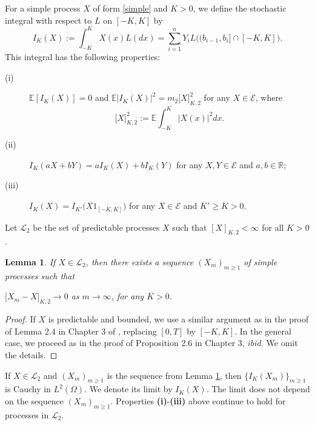 \documentclass[12pt]{article}
\newtheorem{lemma}[theorem]{Lemma}
\def\cE{\mathcal{E}}
\def\cL{\mathcal{L}}
\def\bE{\mathbb{E}}
\def\bR{\mathbb{R}}
\begin{document}

\medskip

For a simple process $X$ of form \eqref{simple} and $K>0$, we define the stochastic integral with respect to $L$ on $[-K,K]$ by
\[
I_K(X):=\int_{-K}^K X(x)L(dx)=\sum_{i=1}^n Y_i L\big((b_{i-1},b_i] \cap [-K,K] \big).
\]
This integral has the following properties:
\begin{description}
\item[(i)] $\bE[I_K(X)]=0$ and $\bE|I_K(X)|^2=m_2 \big[X \big]_{K,2}^2$ for any $X \in \cE$, where
\[
\big[X \big]_{K,2}^2:=\bE \int_{-K}^K |X(x)|^2dx.
\]
\item[(ii)] $I_K(aX+bY)=aI_K(X)+bI_K(Y)$ for any $X,Y \in \cE$ and $a,b \in \bR$;

\item[(iii)] $I_{K}(X)=I_{K'}\big(X 1_{[-K,K]}\big)$ for any $X \in \cE$ and  $K'\geq K>0$.
\end{description}

Let $\cL_2$ be the set of predictable processes $X$ such that $[X]_{K,2}<\infty$ for all $K>0$.



\begin{lemma}
\label{approx}
If $X \in \cL_2$, then there exists a sequence $(X_m)_{m\geq 1}$ of simple processes such that 
 
$\big[X_m-X\big]_{K,2} \to 0$ as $m \to \infty$, for any $K>0$.
\end{lemma}

\begin{proof}
If $X$ is predictable and bounded, we use a similar argument as in the proof of Lemma 2.4 in Chapter 3 of \cite{KS}, 
replacing $[0,T]$ by $[-K,K]$. In the general case, we proceed as in the proof of Proposition 2.6 in Chapter 3, {\em ibid.} We omit the details.
\end{proof}

If $X \in \cL_2$ and $(X_m)_{m\geq 1}$ is the sequence from Lemma \ref{approx}, then $\{I_K(X_m)\}_{m\geq 1}$ is Cauchy in $L^2(\Omega)$. We denote its limit by $I_K(X)$. The limit does not depend on the sequence $(X_m)_{m\geq 1}$. Properties {\bf (i)}-{\bf (iii)} above continue to hold for processes in $\cL_2$. 

\medskip
\end{document}
